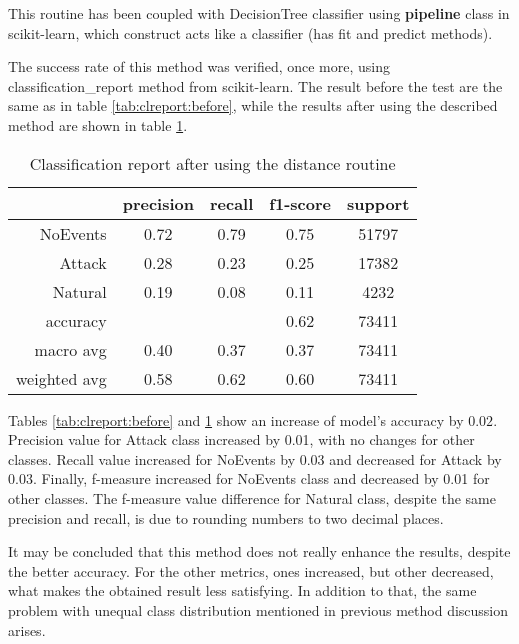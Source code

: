 This routine has been coupled with DecisionTree classifier using \textbf{pipeline} class in scikit-learn, which construct acts like a classifier (has fit and predict methods). 

The success rate of this method was verified, once more, using classification\_report method from scikit-learn. The result before the test are the same as in table \ref{tab:clreport:before}, while the results after using the described method are shown in table \ref{tab:distrep}.

\begin{table}[H]
    \centering
    \caption{Classification report after using the distance routine} \label{tab:distrep}
    \begin{tabular}{rcccc}\toprule
     &   precision    &recall & f1-score &  support  \\\midrule

        NoEvents    &   0.72   &   0.79   &   0.75  &   51797 \\
          Attack    &   0.28   &   0.23   &   0.25  &   17382 \\
         Natural   &    0.19   &   0.08   &   0.11  &    4232 \\
    
        accuracy    &           &         &   0.62   &  73411 \\
       macro avg    &   0.40    &  0.37   &   0.37  &   73411 \\
    weighted avg   &   0.58   &   0.62   &   0.60   &  73411   \\  \bottomrule
    \end{tabular}
\end{table}

Tables \ref{tab:clreport:before} and \ref{tab:distrep} show an increase of model's accuracy by $0.02$. Precision value for Attack class increased by 0.01, with no changes for other classes. Recall value increased for NoEvents by 0.03 and decreased for Attack by 0.03. Finally, f-measure increased for NoEvents class and decreased by 0.01 for other classes. The f-measure value difference for Natural class, despite the same precision and recall, is due to rounding numbers to two decimal places. 

It may be concluded that this method does not really enhance the results, despite the better accuracy. For the other metrics, ones increased, but other decreased, what makes the obtained result less satisfying. In addition to that, the same problem with unequal class distribution mentioned in previous method discussion arises. 

